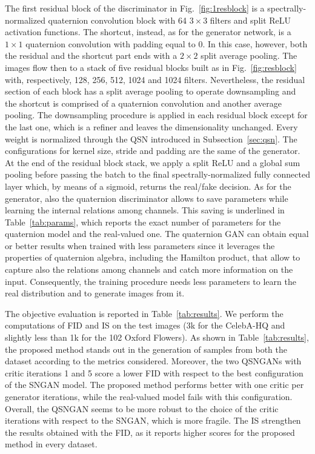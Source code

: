 \documentclass[graybox]{svmult}
\begin{document}
The first residual block of the discriminator in Fig.~\ref{fig:1resblock} is a spectrally-normalized quaternion convolution block with 64 $3 \times 3$ filters and split ReLU activation functions. The shortcut, instead, as for the generator network, is a $1 \times 1$ quaternion convolution with padding equal to 0. In this case, however, both the residual and the shortcut part ends with a $2 \times 2$ split average pooling. The images flow then to a stack of five residual blocks built as in Fig.~\ref{fig:resblock} with, respectively, 128, 256, 512, 1024 and 1024 filters. Nevertheless, the residual section of each block has a split average pooling to operate downsampling and the shortcut is comprised of a quaternion convolution and another average pooling. The downsampling procedure is applied in each residual block except for the last one, which is a refiner and leaves the dimensionality unchanged. Every weight is normalized through the QSN introduced in Subsection~\ref{sec:qsn}. The configurations for kernel size, stride and padding are the same of the generator. At the end of the residual block stack, we apply a split ReLU and a global sum pooling before passing the batch to the final spectrally-normalized fully connected layer which, by means of a sigmoid, returns the real/fake decision. As for the generator, also the quaternion discriminator allows to save parameters while learning the internal relations among channels. This saving is underlined in Table~\ref{tab:params}, which reports the exact number of parameters for the quaternion model and the real-valued one. The quaternion GAN can obtain equal or better results when trained with less parameters since it leverages the properties of quaternion algebra, including the Hamilton product, that allow to capture also the relations among channels and catch more information on the input. Consequently, the training procedure needs less parameters to learn the real distribution and to generate images from it.

The objective evaluation is reported in Table~\ref{tab:results}. We perform the computations of FID and IS on the test images (3k for the CelebA-HQ and slightly less than 1k for the 102 Oxford Flowers). As shown in Table~\ref{tab:results}, the proposed method stands out in the generation of samples from both the dataset according to the metrics considered. Moreover, the two QSNGANs with critic iterations 1 and 5 score a lower FID with respect to the best configuration of the SNGAN model. The proposed method performs better with one critic per generator iterations, while the real-valued model fails with this configuration. Overall, the QSNGAN seems to be more robust to the choice of the critic iterations with respect to the SNGAN, which is more fragile. The IS strengthen the results obtained with the FID, as it reports higher scores for the proposed method in every dataset.
\end{document}
